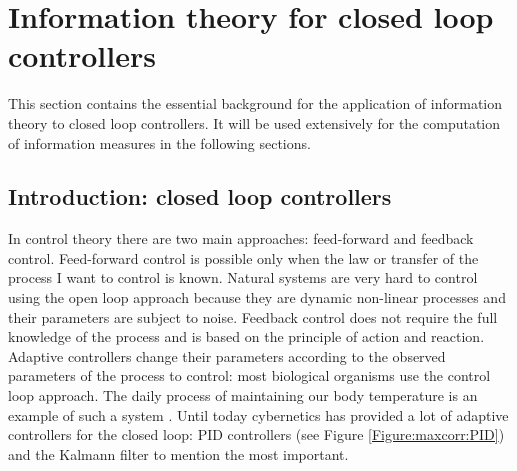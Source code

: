 
\section{Information theory for closed loop controllers \label{Introduction:InfoTheoryClosedLoop}}

This section contains the essential background for the application of information
theory to closed loop controllers.
It will be used extensively for the computation of information measures in the 
following sections.

\subsection{Introduction: closed loop controllers}
In control theory there are two main approaches: feed-forward and feedback control. 
Feed-forward control is possible only when the law or transfer of the
 process I want to control is known. Natural systems are very hard to control
using the open loop approach because they are dynamic non-linear processes and
their parameters are subject to noise. Feedback control does not require
the full knowledge of the process and is based on the principle of action and reaction.
Adaptive controllers change their parameters according to the observed parameters of
the process to control: most biological organisms use the control loop approach.
The daily process of maintaining our body temperature is an example of such a system \citep{HumanBody}.
Until today cybernetics has provided a lot of adaptive controllers for the closed loop:
PID controllers
(see Figure \ref{Figure:maxcorr:PID}) and the Kalmann filter to mention the most important.

